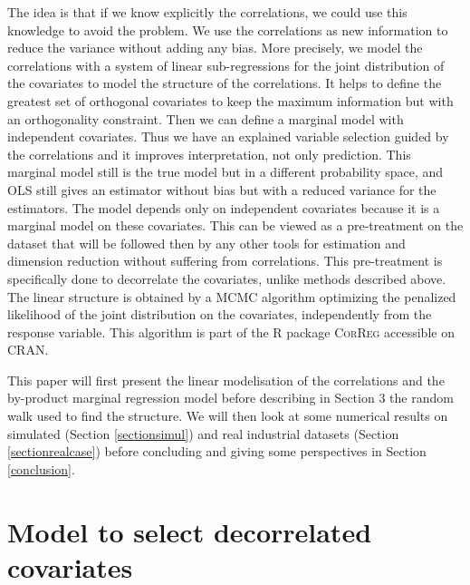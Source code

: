 \documentclass[11pt,a4paper]{article}
\begin{document}
  The idea is that if we know explicitly the correlations, we could use this knowledge to avoid the problem. 
	We use the correlations as new information to reduce the variance without adding any bias.  
  More precisely, we model the correlations with a system of linear sub-regressions for the joint distribution of the covariates to model the structure of the correlations. It helps to define the greatest set of orthogonal covariates to keep the maximum information but with an orthogonality constraint.
Then we can define a marginal model with independent covariates. 
Thus we have an explained variable selection guided by the correlations and it improves interpretation, not only prediction. This marginal model still is the true model but in a different probability space, and OLS still gives an estimator without bias but with a reduced variance for the estimators. The model depends only on independent covariates because it is a marginal model on these covariates.
 This can be viewed as a pre-treatment on the dataset that will be followed then by any other tools for estimation and dimension reduction without suffering from correlations. This pre-treatment is specifically done to decorrelate the covariates, unlike methods described above. 
The linear structure is obtained by a MCMC algorithm optimizing the penalized likelihood of the joint distribution on the covariates, independently from the response variable. This algorithm is part of the R package \textsc{CorReg} accessible on \textsc{CRAN}. %
 
	
 	
 	This paper will first present the linear modelisation of the correlations and the by-product marginal regression model before describing in Section 3 the random walk used to find the structure.
 	We will then look at some numerical results on simulated (Section \ref{sectionsimul}) and real industrial datasets (Section \ref{sectionrealcase}) before concluding and giving some perspectives in Section \ref{conclusion}.
	
\section{Model to select decorrelated covariates}
\end{document}
